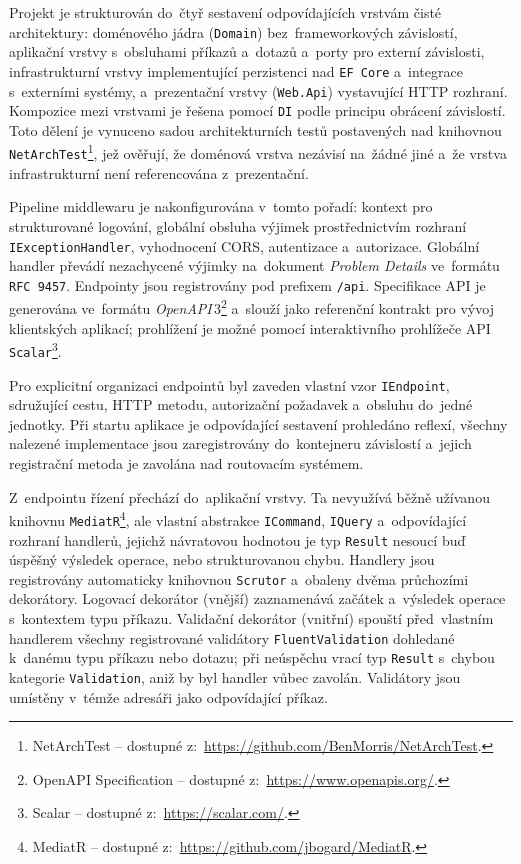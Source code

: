 Projekt je strukturován do~čtyř sestavení odpovídajících vrstvám čisté architektury: doménového jádra (\texttt{Domain}) bez~frameworkových závislostí, aplikační vrstvy s~obsluhami příkazů a~dotazů a~porty pro externí závislosti, infrastrukturní vrstvy implementující perzistenci nad \texttt{EF~Core} a~integrace s~externími systémy, a~prezentační vrstvy (\texttt{Web.Api}) vystavující HTTP rozhraní.
Kompozice mezi vrstvami je řešena pomocí \texttt{DI} podle principu obrácení závislostí.
Toto dělení je vynuceno sadou architekturních testů postavených nad knihovnou \texttt{NetArchTest}\footnote{NetArchTest -- dostupné z:~\url{https://github.com/BenMorris/NetArchTest}.}, jež ověřují, že doménová vrstva nezávisí na~žádné jiné a~že vrstva infrastrukturní není referencována z~prezentační.

Pipeline middlewaru je nakonfigurována v~tomto pořadí: kontext pro strukturované logování, globální obsluha výjimek prostřednictvím rozhraní \texttt{IExceptionHandler}, vyhodnocení CORS, autentizace a~autorizace.
Globální handler převádí nezachycené výjimky na~dokument \emph{Problem Details} ve~formátu \texttt{RFC~9457}.
Endpointy jsou registrovány pod prefixem \texttt{/api}.
Specifikace API je generována ve~formátu \emph{OpenAPI}\,3\footnote{OpenAPI Specification -- dostupné z:~\url{https://www.openapis.org/}.} a~slouží jako referenční kontrakt pro vývoj klientských aplikací; prohlížení je možné pomocí interaktivního prohlížeče API \texttt{Scalar}\footnote{Scalar -- dostupné z:~\url{https://scalar.com/}.}.

Pro explicitní organizaci endpointů byl zaveden vlastní vzor \texttt{IEndpoint}, sdružující cestu, HTTP metodu, autorizační požadavek a~obsluhu do~jedné jednotky.
Při startu aplikace je odpovídající sestavení prohledáno reflexí, všechny nalezené implementace jsou zaregistrovány do~kontejneru závislostí a~jejich registrační metoda je zavolána nad routovacím systémem.

Z~endpointu řízení přechází do~aplikační vrstvy.
Ta nevyužívá běžně užívanou knihovnu \texttt{MediatR}\footnote{MediatR -- dostupné z:~\url{https://github.com/jbogard/MediatR}.}, ale vlastní abstrakce \texttt{ICommand}, \texttt{IQuery} a~odpovídající rozhraní handlerů, jejichž návratovou hodnotou je typ \texttt{Result} nesoucí buď úspěšný výsledek operace, nebo strukturovanou chybu.
Handlery jsou registrovány automaticky knihovnou \texttt{Scrutor} a~obaleny dvěma průchozími dekorátory.
Logovací dekorátor (vnější) zaznamenává začátek a~výsledek operace s~kontextem typu příkazu.
Validační dekorátor (vnitřní) spouští před~vlastním handlerem všechny registrované validátory \texttt{FluentValidation} dohledané k~danému typu příkazu nebo dotazu; při neúspěchu vrací typ \texttt{Result} s~chybou kategorie \texttt{Validation}, aniž by byl handler vůbec zavolán.
Validátory jsou umístěny v~témže adresáři jako odpovídající příkaz.

